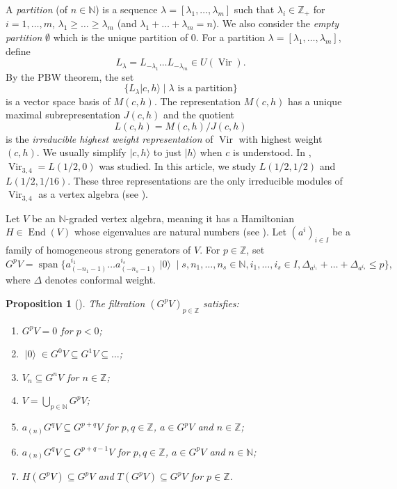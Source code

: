 \documentclass[a4paper, 12pt, reqno]{amsart}
\newtheorem{proposition}[theorem]{Proposition}
\theoremstyle{remark}
\DeclareMathOperator{\Vir}{Vir}
\DeclareMathOperator{\End}{End}
\DeclareMathOperator{\vspan}{span}
\DeclareMathOperator{\vac}{|0\rangle}
\begin{document}
A \emph{partition} (of $n \in \mathbb{N}$) is a sequence $\lambda = [\lambda_1, \dots, \lambda_m]$ such that $\lambda_i \in \mathbb{Z}_+$ for $i = 1, \dots, m$, $\lambda_1 \ge \dots \ge \lambda_m$ (and $\lambda_1 + \dots + \lambda_m = n$).
We also consider the \emph{empty partition} $\emptyset$ which is the unique partition of $0$.
For a partition $\lambda = [\lambda_1, \dots, \lambda_m]$, define
\begin{equation*}
  L_{\lambda} = L_{-\lambda_1}\dots L_{-\lambda_m} \in U(\Vir).
\end{equation*}
By the PBW theorem, the set
\begin{equation*}
  \{L_{\lambda}|c,h\rangle \mid \lambda\text{ is a partition}\}
\end{equation*}
is a vector space basis of $M(c, h)$.
The representation $M(c, h)$ has a unique maximal subrepresentation $J(c, h)$ and the quotient
\begin{equation*}
  L(c, h) = M(c, h)/J(c, h)
\end{equation*}
is the \emph{irreducible highest weight representation} of $\Vir$ with highest weight $(c, h)$.
We usually simplify $|c, h\rangle$ to just $|h\rangle$ when $c$ is understood.
In \cite{andrews_singular_2022}, $\Vir_{3, 4} = L(1/2, 0)$ was studied.
In this article, we study $L(1/2, 1/2)$ and $L(1/2, 1/16)$.
These three representations are the only irreducible modules of $\Vir_{3, 4}$ as a vertex algebra (see \cite[Theorem 4.2]{wang_rationality_1993}).

Let $V$ be an $\mathbb{N}$-graded vertex algebra, meaning it has a Hamiltonian $H \in \End(V)$ whose eigenvalues are natural numbers (see \cite[\S1.6]{de_sole_finite_2006}).
Let $(a^i)_{i \in I}$ be a family of homogeneous strong generators of $V$.
For $p \in \mathbb{Z}$, set
\begin{equation*}
  G^pV = \vspan\{a^{i_1}_{(-n_1 - 1)}\dots a^{i_s}_{(-n_s - 1)}\vac \mid s, n_1, \dots, n_s \in \mathbb{N}, i_1, \dots, i_s \in I, \Delta_{a^{i_1}} + \dots + \Delta_{a^{i_s}} \le p\},
\end{equation*}
where $\Delta$ denotes conformal weight.

\begin{proposition}[{\cite{li_vertex_2004}}]
  \label{prp:1}
  The filtration $(G^pV)_{p \in \mathbb{Z}}$ satisfies:
  \begin{enumerate}
  \item $G^pV = 0$ for $p < 0$;
  \item $\vac \in G^0V \subseteq G^1V \subseteq \dots$;
  \item $V_n \subseteq G^nV$ for $n \in \mathbb{Z}$;
  \item $V = \bigcup_{p \in \mathbb{N}}G^pV$;
  \item $a_{(n)}G^qV \subseteq G^{p + q}V$ for $p, q \in \mathbb{Z}$, $a \in G^pV$ and $n \in \mathbb{Z}$;
  \item $a_{(n)}G^qV \subseteq G^{p + q - 1}V$ for $p, q \in \mathbb{Z}$, $a \in G^pV$ and $n \in \mathbb{N}$;
  \item $H(G^pV) \subseteq G^pV$ and $T(G^pV) \subseteq G^pV$ for $p \in \mathbb{Z}$.
  \end{enumerate}
\end{proposition}
\end{document}

